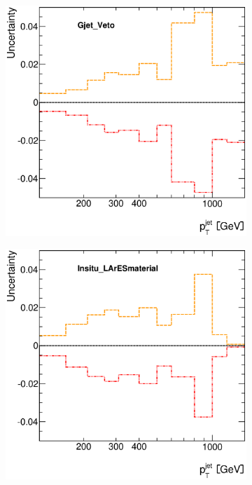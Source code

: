 \documentclass[12pt, twoside]{article}
\numberwithin{equation}{section}
\numberwithin{figure}{section}
\newenvironment{changemargin}[2]{%
\begin{list}{}{%
\setlength{\topsep}{0pt}%
\setlength{\leftmargin}{#1}%
\setlength{\rightmargin}{#2}%
\setlength{\listparindent}{\parindent}%
\setlength{\itemindent}{\parindent}%
\setlength{\parsep}{\parskip}%
}%
\item[]}{\end{list}}
\begin{document}
\begin{figure}[H]
\begin{changemargin}{-1.0cm}{-0.75cm}
\begin{changemargin}{-0.75cm}{-1.0cm}
\begin{subfigure}[b]{0.25\textwidth}
        \end{subfigure}
        \begin{subfigure}[b]{0.25\textwidth}
            \includegraphics[width=\textwidth]{./images/JetSystematics/JetSystematic-19.eps}
        \end{subfigure}
        \begin{subfigure}[b]{0.25\textwidth}
            \includegraphics[width=\textwidth]{./images/JetSystematics/JetSystematic-20.eps}
        \end{subfigure}
    \end{changemargin}


\end{changemargin}
\end{figure}
\end{document}
